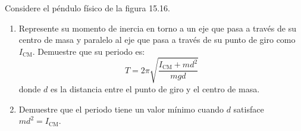 \item Considere el péndulo físico de la figura 15.16.
\begin{enumerate}
    \item Represente su momento de inercia en torno a un eje que pasa a través de su centro de masa y paralelo al eje que pasa a través de su punto de giro como $I_{\text{CM}}$. Demuestre que su periodo es:
    $$ T = 2\pi \sqrt{\frac{I_{\text{CM}} + md^2}{mgd}} $$
    donde $d$ es la distancia entre el punto de giro y el centro de masa.
    \item Demuestre que el periodo tiene un valor mínimo cuando $d$ satisface $md^2 = I_{\text{CM}}$.
\end{enumerate}